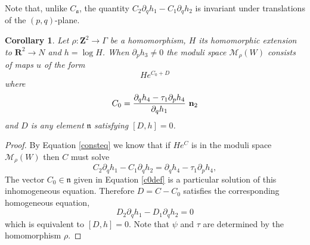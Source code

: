 \documentclass[11pt]{amsart}
\newcommand{\mM}{\mathcal{M}}
\newcommand{\RR}{\mathbf{R}}
\newcommand{\ZZ}{\mathbf{Z}}
\newcommand{\WW}{W}
\newcommand{\nn}{\mathfrak{n}}
\renewcommand{\aa}{\mathfrak{a}}
\numberwithin{equation}{section}
\newtheorem{cor}[equation]{Corollary}
\theoremstyle{definition}
\theoremstyle{remark}
\begin{document}
Note that, unlike $C_{\aa}$, the quantity $C_2\partial_qh_1-C_1\partial_qh_2$ is invariant under translations of the $(p,q)$-plane.
\begin{cor}\label{generaleqn}
Let $\rho\colon\ZZ^2\to\Gamma$ be a homomorphism, $H$ its homomorphic extension to $\RR^2\to N$ and $h=\log H$. When $\partial_ph_3\neq 0$ the moduli space $\mM_{\rho}(\WW)$ consists of maps $u$ of the form
\[He^{C_0+D}\]
where
\begin{equation}\label{c0def}C_0=\frac{\partial_qh_4-\tau_1\partial_ph_4}{\partial_qh_1}\ {\bf n}_2\end{equation}
and $D$ is any element $\nn$ satisfying $[D,h]=0$.
\end{cor}
\begin{proof}
By Equation \eqref{consteq} we know that if $He^C$ is in the moduli space $\mM_{\rho}(\WW)$ then $C$ must solve
\[C_2\partial_qh_1-C_1\partial_qh_2=\partial_qh_4-\tau_1\partial_ph_4,\]
The vector $C_0\in\nn$ given in Equation \ref{c0def} is a particular solution of this inhomogeneous equation. Therefore $D=C-C_0$ satisfies the corresponding homogeneous equation,
\[D_2\partial_qh_1-D_1\partial_qh_2=0\]
which is equivalent to $[D,h]=0$. Note that $\psi$ and $\tau$ are determined by the homomorphism $\rho$.
\end{proof}
\end{document}
